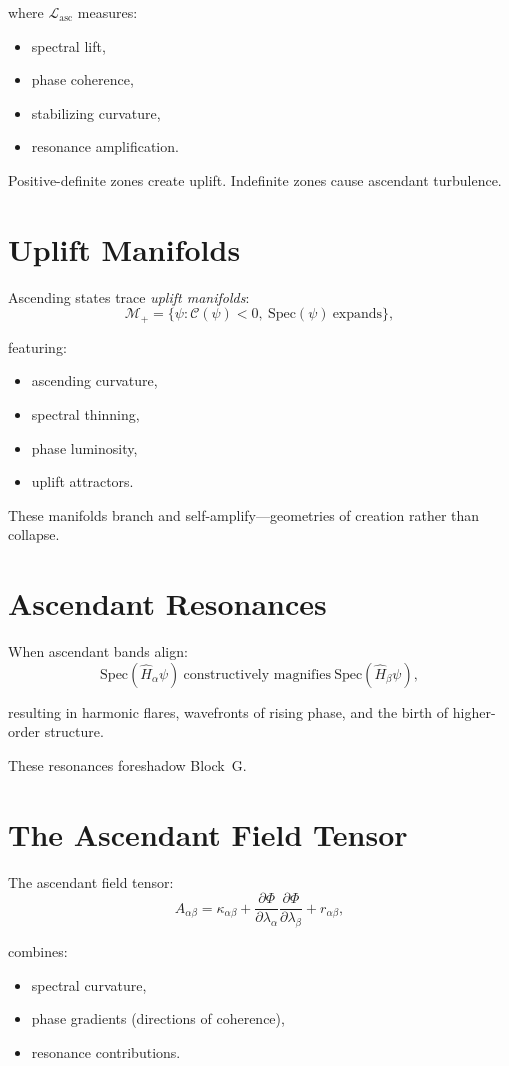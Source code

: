 where $\mathcal{L}_{\mathrm{asc}}$ measures:
\begin{itemize}
  \item spectral lift,
  \item phase coherence,
  \item stabilizing curvature,
  \item resonance amplification.
\end{itemize}

Positive-definite zones create uplift.  
Indefinite zones cause ascendant turbulence.

\section{Uplift Manifolds}
Ascending states trace \emph{uplift manifolds}:
\[
\mathcal{M}_{+}
=
\{\psi : \mathcal{C}(\psi) < 0,\ \mathrm{Spec}(\psi)\ \text{expands}\},
\]

featuring:
\begin{itemize}
  \item ascending curvature,
  \item spectral thinning,
  \item phase luminosity,
  \item uplift attractors.
\end{itemize}

These manifolds branch and self-amplify—geometries of creation rather than collapse.

\section{Ascendant Resonances}
When ascendant bands align:
\[
\mathrm{Spec}(\hat{H}_\alpha \psi)
\ \text{constructively magnifies}\
\mathrm{Spec}(\hat{H}_\beta \psi),
\]

resulting in harmonic flares, wavefronts of rising phase, and the birth of higher-order structure.

These resonances foreshadow Block~G.

\section{The Ascendant Field Tensor}
The ascendant field tensor:
\[
A_{\alpha\beta}
=
\kappa_{\alpha\beta}
+
\frac{\partial \Phi}{\partial \lambda_\alpha}
\frac{\partial \Phi}{\partial \lambda_\beta}
+
r_{\alpha\beta},
\]

combines:
\begin{itemize}
  \item spectral curvature,
  \item phase gradients (directions of coherence),
  \item resonance contributions.
\end{itemize}

